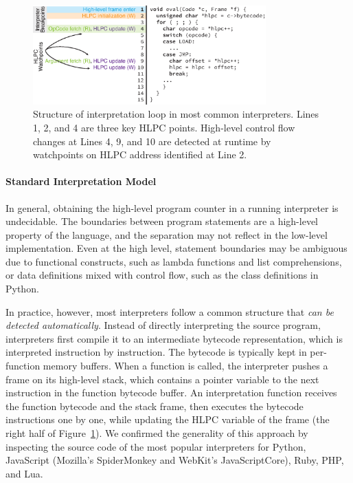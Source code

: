 \begin{figure}
  \centering
  \includegraphics[width=0.8\textwidth]{chef/figures/interp-model}
  \caption{Structure of interpretation loop in most common interpreters.  Lines 1, 2, and 4 are three key HLPC points.  High-level control flow changes at Lines 4, 9, and 10 are detected at runtime by watchpoints on HLPC address identified at Line 2.}
  \label{fig:chef:interp-model}
\end{figure}

\paragraph{Standard Interpretation Model}

In general, obtaining the high-level program counter in a running interpreter is undecidable.
%
The boundaries between program statements are a high-level property of the language, and the separation may not reflect in the low-level implementation.  Even at the high level, statement boundaries may be ambiguous due to functional constructs, such as lambda functions and list comprehensions, or data definitions mixed with control flow, such as the class definitions in Python.

In practice, however, most interpreters follow a common structure that \emph{can be detected automatically}.
%
Instead of directly interpreting the source program, interpreters first compile it to an intermediate bytecode representation, which is interpreted instruction by instruction.  The bytecode is typically kept in per-function memory buffers.
%
When a function is called, the interpreter pushes a frame on its high-level stack, which contains a pointer variable to the next instruction in the function bytecode buffer.
%
An interpretation function receives the function bytecode and the stack frame, then executes the bytecode instructions one by one, while updating the HLPC variable of the frame (the right half of Figure~\ref{fig:chef:interp-model}).
%
We confirmed the generality of this approach by inspecting the source code of the most popular interpreters for Python, JavaScript (Mozilla's SpiderMonkey and WebKit's JavaScriptCore), Ruby, PHP, and Lua.

